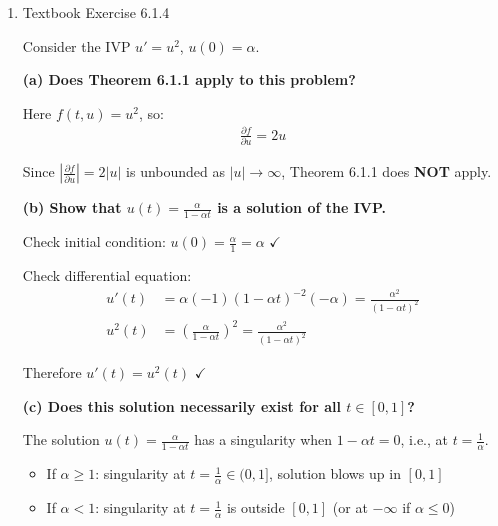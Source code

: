 \documentclass[reqno, answers]{exam}
\begin{document}
\begin{enumerate}
\begin{solution}
          Conclusion: Does \textbf{NOT} satisfy Theorem 6.1.2 because $\frac{\partial f}{\partial u}$ is unbounded (no finite $L$ exists)

        \end{solution}


  \item Textbook Exercise 6.1.4
        \begin{solution}
          Consider the IVP $u' = u^2$, $u(0) = \alpha$.

          \medskip

          \textbf{(a) Does Theorem 6.1.1 apply to this problem?}

          Here $f(t,u) = u^2$, so:
          \begin{align*}
            \frac{\partial f}{\partial u} = 2u
          \end{align*}

          Since $\left|\frac{\partial f}{\partial u}\right| = 2|u|$ is unbounded as $|u| \to \infty$, Theorem 6.1.1 does \textbf{NOT} apply.

          \medskip

          \textbf{(b) Show that $u(t) = \frac{\alpha}{1-\alpha t}$ is a solution of the IVP.}

          Check initial condition: $u(0) = \frac{\alpha}{1} = \alpha$ \quad $\checkmark$

          Check differential equation:
          \begin{align*}
            u'(t)  & = \alpha(-1)(1-\alpha t)^{-2}(-\alpha) = \frac{\alpha^2}{(1-\alpha t)^2}     \\
            u^2(t) & = \left(\frac{\alpha}{1-\alpha t}\right)^2 = \frac{\alpha^2}{(1-\alpha t)^2}
          \end{align*}

          Therefore $u'(t) = u^2(t)$ \quad $\checkmark$

          \medskip

          \textbf{(c) Does this solution necessarily exist for all $t \in [0,1]$?}

          The solution $u(t) = \frac{\alpha}{1-\alpha t}$ has a singularity when $1 - \alpha t = 0$, i.e., at $t = \frac{1}{\alpha}$.

          \begin{itemize}
            \item If $\alpha \geq 1$: singularity at $t = \frac{1}{\alpha} \in (0,1]$, solution blows up in $[0,1]$
            \item If $\alpha < 1$: singularity at $t = \frac{1}{\alpha}$ is outside $[0,1]$ (or at $-\infty$ if $\alpha \leq 0$)
          \end{itemize}


\end{solution}
\end{enumerate}
\end{document}

